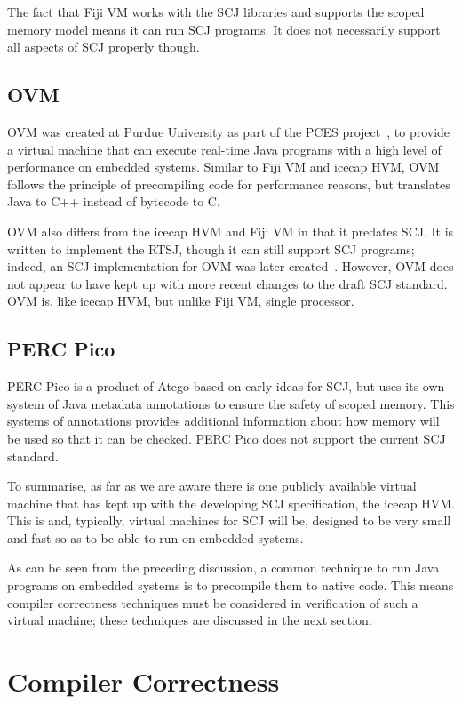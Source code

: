 \documentclass[a4paper,10pt]{report}
\begin{document}
The fact that Fiji VM works with the SCJ libraries and supports the scoped
memory model means it can run SCJ programs.  It does not necessarily support all
aspects of SCJ properly though.


\subsection{OVM}

OVM was created at Purdue University as part of the PCES
project~\cite{baker2006}, to provide a virtual machine that can execute
real-time Java programs with a high level of performance on embedded systems.
Similar to Fiji VM and icecap HVM, OVM follows the principle of precompiling
code for performance reasons, but translates Java to C++ instead of bytecode to
C.


OVM also differs from the icecap HVM and Fiji VM in that it predates SCJ. It is
written to implement the RTSJ, though it can still support SCJ programs; indeed,
an SCJ implementation for OVM was later created~\cite{plsek2010}. However, OVM
does not appear to have kept up with more recent changes to the draft SCJ
standard. OVM is, like icecap HVM, but unlike Fiji VM, single processor.

\subsection{PERC Pico}

PERC Pico is a product of Atego based on early ideas for SCJ, but uses its own
system of Java metadata annotations to ensure the safety of scoped memory.  This
systems of annotations provides additional information about how memory will be
used so that it can be checked. PERC Pico does not support the current SCJ
standard.

To summarise, as far as we are aware there is one publicly available virtual
machine that has kept up with the developing SCJ specification, the icecap
HVM. This is and, typically, virtual machines for SCJ will be, designed to be
very small and fast so as to be able to run on embedded systems.

As can be seen from the preceding discussion, a common technique to run Java
programs on embedded systems is to precompile them to native code. This means
compiler correctness techniques must be considered in verification of such a
virtual machine; these techniques are discussed in the next section.

\section{Compiler Correctness}
\label{compiler-correctness-section}
\end{document}
